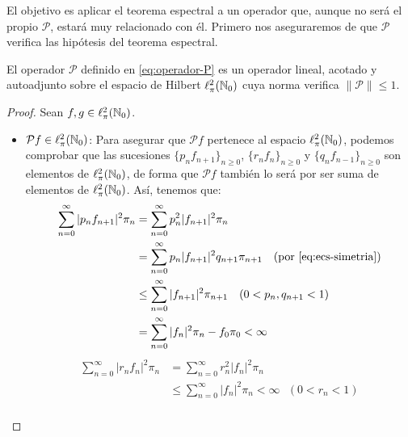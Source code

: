     El objetivo es aplicar el teorema espectral a un operador que, aunque no será el propio $\mathcal P$, estará muy relacionado con él. Primero nos aseguraremos de que $\mathcal P$ verifica las hipótesis del teorema espectral.

    \begin{lema}
        El operador $\mathcal P$ definido en \eqref{eq:operador-P} es un operador lineal, acotado y autoadjunto sobre el espacio de Hilbert $\ell^2_\pi(\mathbb{N}_0)$ cuya norma verifica $\|\mathcal P\|\leq 1$.
    \end{lema}
    \begin{proof} Sean $f,g\in\ell^2_\pi(\mathbb{N}_0)$.
        \begin{itemize}
            \item $\mathcal P f\in \ell^2_\pi(\mathbb{N}_0)$: Para asegurar que $\mathcal P f$ pertenece al espacio $\ell^2_\pi(\mathbb{N}_0)$, podemos comprobar que las sucesiones $\{p_n f_{n+1}\}_{n\geq 0}$, $\{r_n f_{n}\}_{n\geq 0}$ y $\{q_n f_{n-1}\}_{n\geq 0}$ son elementos de $\ell^2_\pi(\mathbb{N}_0)$, de forma que $\mathcal P f$ también lo será por ser suma de elementos de $\ell^2_\pi(\mathbb{N}_0)$. Así, tenemos que:
            \begin{equation*}
                \begin{split}
                    \sum_{n=0}^\infty |p_n f_{n+1}|^2 \pi_n &= \sum_{n=0}^\infty p_n^2 |f_{n+1}|^2 \pi_n \\
                    &= \sum_{n=0}^\infty p_n |f_{n+1}|^2 q_{n+1}\pi_{n+1} \ \ \ \text{(por \eqref{eq:ecs-simetria})} \\
                    &\leq  \sum_{n=0}^\infty  |f_{n+1}|^2\pi_{n+1} \ \ \ (0<p_n,q_{n+1} <1) \\
                    &= \sum_{n=0}^\infty |f_n|^2 \pi_n - f_0\pi_0 < \infty
                \end{split}
            \end{equation*}
            \begin{equation*}
                \begin{split}
                    \sum_{n=0}^\infty |r_n f_{n}|^2 \pi_n &= \sum_{n=0}^\infty r_n^2 |f_{n}|^2 \pi_n \\
                    &\leq  \sum_{n=0}^\infty  |f_{n}|^2\pi_{n} < \infty \ \ \ (0<r_n <1)
                \end{split}
            \end{equation*}
            \begin{equation*}
                \begin{split}

\end{split}
\end{equation*}
\end{itemize}
\end{proof}
